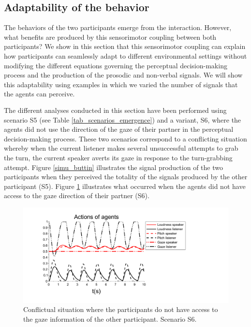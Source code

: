 \documentclass[twocolumn]{svjour3}
\begin{document}
\subsection{Adaptability of the behavior}

The behaviors of the two participants emerge from the interaction. However, what benefits are produced by this sensorimotor coupling between both participants?
We show in this section that this sensorimotor coupling can explain how participants can seamlessly adapt to different environmental settings without modifying the different equations governing the perceptual decision-making process and the production of the prosodic and non-verbal signals. We will show this adaptability using examples in which we varied the number of signals that the agents can perceive. 

The different analyses conducted in this section have been performed using scenario S5 (see Table \ref{tab_scenarios_emergence}) and a variant, S6, where the agents did not use the direction of the gaze of their partner in the perceptual decision-making process. 
These two scenarios correspond to a conflicting situation whereby when the current listener makes several unsuccessful attempts to grab the turn, the current speaker averts its gaze in response to the turn-grabbing attempt. Figure \ref{simu_buttin} illustrates the signal production of the two participants when they perceived the totality of the signals produced by the other participant (S5). Figure \ref{adapt_nogaze} illustrates what occurred when the agents did not have access to the gaze direction of their partner (S6).

\begin{figure}
  \centering
  \includegraphics[width=\linewidth]{figure/adapt_nogaze.pdf}
  \caption{Conflictual situation where the participants do not have access to the gaze information of the other participant. Scenario S6.}
  \label{adapt_nogaze}
\end{figure}
\end{document}
